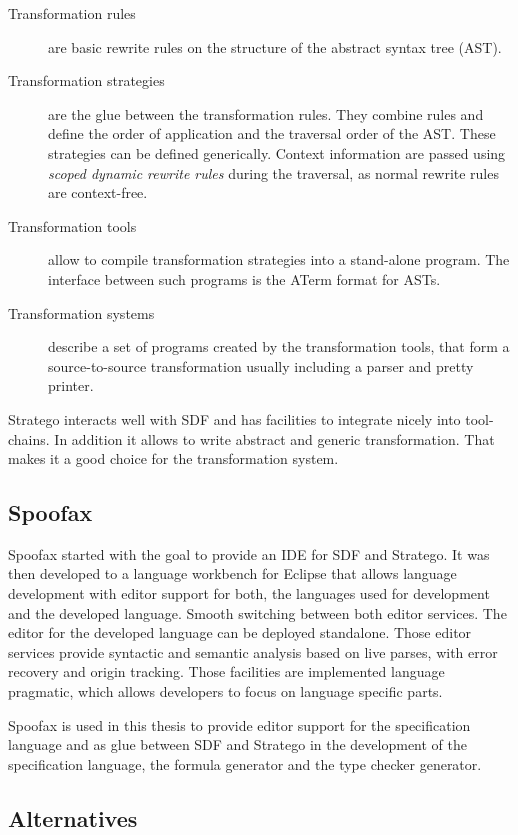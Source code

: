 \begin{description}
\item[Transformation rules] are basic rewrite rules on the structure
  of the abstract syntax tree (AST).
\item[Transformation strategies] are the glue between the
  transformation rules. They combine rules and define the order of
  application and the traversal order of the AST. These strategies can
  be defined generically. Context information are passed using
  \textit{scoped dynamic rewrite rules} during the traversal, as
  normal rewrite rules are context-free.
\item[Transformation tools] allow to compile transformation strategies
  into a stand-alone program. The interface between such programs is
  the ATerm format for ASTs.
\item[Transformation systems] describe a set of programs created by
  the transformation tools, that form a source-to-source
  transformation usually including a parser and pretty printer.
\end{description}


Stratego interacts well with SDF and has facilities to integrate
nicely into tool-chains. In addition it allows to write abstract and
generic transformation. That makes it a good choice for the
transformation system.
\subsection{Spoofax}
Spoofax started with the goal to provide an IDE for SDF and
Stratego. It was then developed to a language workbench for Eclipse
that allows language development with editor support for both, the
languages used for development and the developed language. Smooth
switching between both editor services. The editor for the developed
language can be deployed standalone. Those editor services provide
syntactic and semantic analysis based on live parses, with error
recovery and origin tracking. Those facilities are implemented
language pragmatic, which allows developers to focus on language
specific parts.

Spoofax is used in this thesis to provide editor support for the
specification language and as glue between SDF and Stratego in the
development of the specification language, the formula generator and
the type checker generator.
\subsection{Alternatives}
